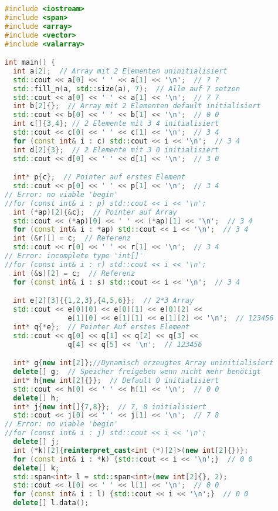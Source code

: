\documentclass[10pt,twocolumn]{scrartcl}
\begin{document}
\begin{lstlisting}[language=C++]
#include <iostream>
#include <span>
#include <array>
#include <vector>
#include <valarray>

int main() {
  int a[2];  // Array mit 2 Elementen uninitialisiert
  std::cout << a[0] << ' ' << a[1] << '\n';  // ? ?
  std::fill_n(a, std::size(a), 7);  // Alle auf 7 setzen
  std::cout << a[0] << ' ' << a[1] << '\n';  // 7 7
  int b[2]{};  // Array mit 2 Elementen default initialisiert
  std::cout << b[0] << ' ' << b[1] << '\n';  // 0 0
  int c[]{3,4}; // 2 Elemente mit 3 4 initialisiert
  std::cout << c[0] << ' ' << c[1] << '\n';  // 3 4
  for (const int& i : c) std::cout << i << '\n';  // 3 4
  int d[2]{3};  // 2 Elemente mit 3 0 initialisiert
  std::cout << d[0] << ' ' << d[1] << '\n';  // 3 0

  int* p{c};  // Pointer auf erstes Element
  std::cout << p[0] << ' ' << p[1] << '\n';  // 3 4
// Error: no viable 'begin'
//for (const int& i : p) std::cout << i << '\n';
  int (*ap)[2]{&c};  // Pointer auf Array
  std::cout << (*ap)[0] << ' ' << (*ap)[1] << '\n';  // 3 4
  for (const int& i : *ap) std::cout << i << '\n';  // 3 4
  int (&r)[] = c;  // Referenz
  std::cout << r[0] << ' ' << r[1] << '\n';  // 3 4
// Error: incomplete type 'int[]'
//for (const int& i : r) std::cout << i << '\n';
  int (&s)[2] = c;  // Referenz
  for (const int& i : s) std::cout << i << '\n';  // 3 4

  int e[2][3]{{1,2,3},{4,5,6}};  // 2*3 Array
  std::cout << e[0][0] << e[0][1] << e[0][2] <<
               e[1][0] << e[1][1] << e[1][2] << '\n';  // 123456
  int* q{*e};  // Pointer Auf erstes Element
  std::cout << q[0] << q[1] << q[2] << q[3] <<
               q[4] << q[5] << '\n';  // 123456

  int* g{new int[2]};//Dynamisch erzeugtes Array uninitialisiert
  delete[] g;  // Speicher freigeben wenn nicht mehr benötigt
  int* h{new int[2]{}};  // Default 0 initialisiert
  std::cout << h[0] << ' ' << h[1] << '\n';  // 0 0
  delete[] h;
  int* j{new int[]{7,8}};  // 7, 8 initialisiert
  std::cout << j[0] << ' ' << j[1] << '\n';  // 7 8
// Error: no viable 'begin'
//for (const int& i : j) std::cout << i << '\n';
  delete[] j;
  int (*k)[2]{reinterpret_cast<int (*)[2]>(new int[2]{})};
  for (const int& i : *k) {std::cout << i << '\n';}  // 0 0
  delete[] k;
  std::span<int> l = std::span<int>(new int[2]{}, 2);
  std::cout << l[0] << ' ' << l[1] << '\n';  // 0 0
  for (const int& i : l) {std::cout << i << '\n';}  // 0 0
  delete[] l.data();


\end{lstlisting}
\end{document}
